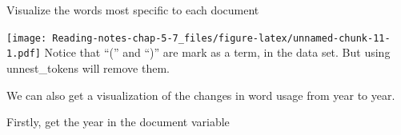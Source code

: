 \documentclass[]{article}
\newenvironment{Shaded}{\begin{snugshade}}{\end{snugshade}}
\newcommand{\DataTypeTok}[1]{\textcolor[rgb]{0.13,0.29,0.53}{#1}}
\newcommand{\DecValTok}[1]{\textcolor[rgb]{0.00,0.00,0.81}{#1}}
\newcommand{\KeywordTok}[1]{\textcolor[rgb]{0.13,0.29,0.53}{\textbf{#1}}}
\newcommand{\NormalTok}[1]{#1}
\newcommand{\OperatorTok}[1]{\textcolor[rgb]{0.81,0.36,0.00}{\textbf{#1}}}
\newcommand{\OtherTok}[1]{\textcolor[rgb]{0.56,0.35,0.01}{#1}}
\newcommand{\StringTok}[1]{\textcolor[rgb]{0.31,0.60,0.02}{#1}}
\begin{document}
Visualize the words most specific to each document

\begin{Shaded}
\end{Shaded}

\texttt{[image: Reading-notes-chap-5-7\_files/figure-latex/unnamed-chunk-11-1.pdf]}
Notice that ``('' and ``)'' are mark as a term, in the data set. But
using unnest\_tokens will remove them.

We can also get a visualization of the changes in word usage from year
to year.

Firstly, get the year in the document variable
\end{document}
